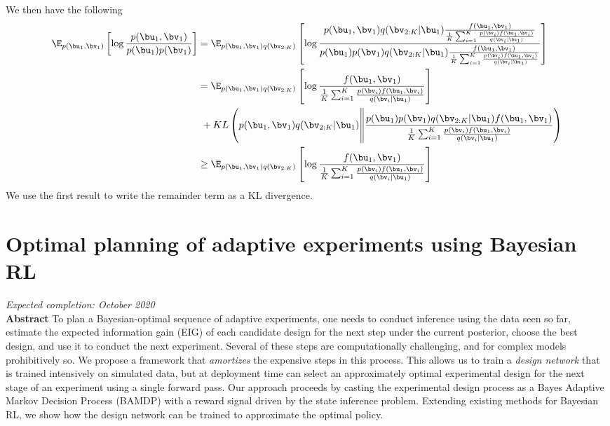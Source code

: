 We then have the following
\begin{align}
	\E_{p(\bu_1,\bv_1)}\left[\log \frac{p(\bu_1,\bv_1)}{p(\bu_1)p(\bv_1)} \right] &= \E_{p(\bu_1,\bv_1)q(\bv_{2:K})}\left[\log \frac{p(\bu_1,\bv_1)q(\bv_{2:K}|\bu_1)\frac{f(\bu_1,\bv_1)}{\frac{1}{K}\sum_{i=1}^K \frac{p(\bv_i)f(\bu_1,\bv_i)}{q(\bv_i|\bu_1)}}}{p(\bu_1)p(\bv_1)q(\bv_{2:K}|\bu_1)\frac{f(\bu_1,\bv_1)}{\frac{1}{K}\sum_{i=1}^K \frac{p(\bv_i)f(\bu_1,\bv_i)}{q(\bv_i|\bu_1)}}} \right] \\
	&= \E_{p(\bu_1,\bv_1)q(\bv_{2:K})}\left[\log \frac{f(\bu_1,\bv_1)}{\frac{1}{K}\sum_{i=1}^K \frac{p(\bv_i)f(\bu_1,\bv_i)}{q(\bv_i|\bu_1)}}\right] \\ &\ + KL\left(p(\bu_1,\bv_1)q(\bv_{2:K}|\bu_1) \middle \| \frac{p(\bu_1)p(\bv_1)q(\bv_{2:K}|\bu_1)f(\bu_1,\bv_1)}{\frac{1}{K}\sum_{i=1}^K \frac{p(\bv_i)f(\bu_1,\bv_i)}{q(\bv_i|\bu_1)}} \right) \\
	&\ge \E_{p(\bu_1,\bv_1)q(\bv_{2:K})}\left[\log \frac{f(\bu_1,\bv_1)}{\frac{1}{K}\sum_{i=1}^K \frac{p(\bv_i)f(\bu_1,\bv_i)}{q(\bv_i|\bu_1)}}\right]
\end{align}
We use the first result to write the remainder term as a KL divergence.

\section{Optimal planning of adaptive experiments using Bayesian RL}
\textit{Expected completion: October 2020} \\
\textbf{Abstract} To plan a Bayesian-optimal sequence of adaptive experiments, one needs to conduct inference using the data seen so far, estimate the expected information gain (EIG) of each candidate design for the next step under the current posterior, choose the best design, and use it to conduct the next experiment. Several of these steps are computationally challenging, and for complex models prohibitively so. We propose a framework that \textit{amortizes} the expensive steps in this process. This allows us to train a \textit{design network} that is trained intensively on simulated data, but at deployment time can select an approximately optimal experimental design for the next stage of an experiment using a single forward pass. Our approach proceeds by casting the experimental design process as a Bayes Adaptive Markov Decision Process (BAMDP) with a reward signal driven by the state inference problem. Extending existing methods for Bayesian RL, we show how the design network can be trained to approximate the optimal policy.

